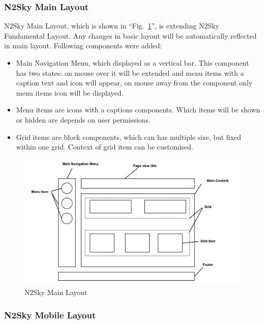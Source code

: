 \subsubsection{N2Sky Main Layout}\label{N2Sky Main Layout}

N2Sky Main Layout, which is shown in ``Fig.~\ref{fig:layout_main}'',  is extending N2Sky Fundamental Layout. Any changes in basic layout will be automatically reflected in main layout. Following components were added:
\begin{itemize}
\item Main Navigation Menu, which displayed as a vertical bar. This component has two states: on mouse over it will be extended and menu items with a caption text and icon will appear, on mouse away from the component only menu items icon will be displayed. 
\item Menu items are icons with a captions components. Which items will be shown or hidden are depends on user permissions.
\item Grid items are block components, which can has multiple size, but fixed within one grid. Context of grid item can be customised. 
\end{itemize}

\begin{figure}[htbp]
\begin{center}
  \includegraphics[width=\linewidth]{components/3/components/layout_main.png}
  \caption{N2Sky Main Layout}
  \label{fig:layout_main}
\end{center}
\end{figure}

\subsubsection{N2Sky Mobile Layout}\label{N2Sky Mobile Layout}

